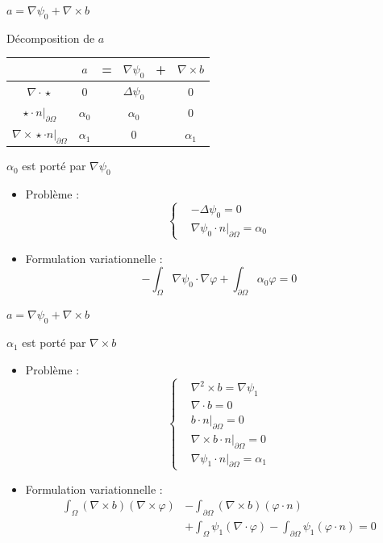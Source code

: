 \documentclass{beamer}
\newcommand{\grad}{{\nabla}}
\newcommand{\laplace}{{\Delta}}
\newcommand{\rot}{{\nabla\times}}
\newcommand{\rott}{{\nabla^2\times}}
\newcommand{\diverg}{{\nabla\cdot}}
\newcommand{\restr}{{\big\rvert_{\partial\Omega}}}
\begin{document}
\begin{frame}{$a=\grad\psi_0+\rot b$}
\begin{block}{Décomposition de $a$}
\begin{center}
\begin{tabular}{c|ccccc}
& $a$ & = & $\grad\psi_0$ & + & $\rot b$ \\ \hline
$\diverg\star$ & 0 & & $\laplace\psi_0$ & & 0\\ \hline
$\star\cdot n\restr$ & $\alpha_0$ & & $\alpha_0$ & & 0\\ \hline
$\rot\star\cdot n\restr$ & $\alpha_1$ & & 0 & & $\alpha_1$
\end{tabular}
\end{center}
\end{block}
\begin{block}{$\alpha_0$ est porté par $\grad\psi_0$}
\begin{itemize}
\item Problème :
\[\left\{
\begin{aligned}
&-\laplace\psi_0 = 0\\
&\grad\psi_0\cdot n\restr=\alpha_0
\end{aligned}
\right.\]
\item Formulation variationnelle :
\[
-\int_\Omega \grad\psi_0\cdot\grad\varphi + \int_{\partial\Omega} \alpha_0\varphi = 0
\]
\end{itemize}
\end{block}
\end{frame}

\begin{frame}{$a=\grad\psi_0+\rot b$}
\begin{block}{$\alpha_1$ est porté par $\rot b$}
\begin{itemize}
\item Problème :
\[\left\{
\begin{aligned}
&\rott b = \grad\psi_1\\
&\diverg b = 0\\
&b\cdot n\restr = 0\\
&\rot b\cdot n\restr = 0\\
&\grad\psi_1\cdot n\restr = \alpha_1
\end{aligned}
\right.\]
\item Formulation variationnelle :
\begin{align*}
\int_\Omega (\rot b)(\rot\varphi) &- \int_{\partial\Omega} (\rot b)(\varphi\cdot n) \\
&+\int_\Omega \psi_1(\diverg\varphi) - \int_{\partial\Omega} \psi_1(\varphi\cdot n) = 0
\end{align*}
\end{itemize}
\end{block}
\end{frame}
\end{document}
